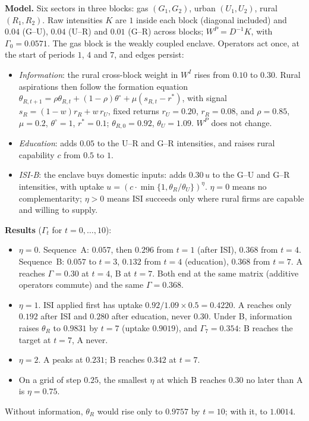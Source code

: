 \documentclass[../solutions_manual.tex]{subfiles}
\begin{document}
 \textbf{Model.} Six sectors in three blocks: gas $(G_1, G_2)$, urban $(U_1, U_2)$, rural $(R_1, R_2)$. Raw intensities $K$ are $1$ inside each block (diagonal included) and $0.04$ (G--U), $0.04$ (U--R) and $0.01$ (G--R) across blocks; $W^P = D^{-1}K$, with $\Gamma_0 = 0.0571$. The gas block is the weakly coupled enclave. Operators act once, at the start of periods $1$, $4$ and $7$, and edges persist:
\begin{itemize}
\item \emph{Information}: the rural cross-block weight in $W^I$ rises from $0.10$ to $0.30$. Rural aspirations then follow the formation equation $\theta_{R,t+1} = \rho\theta_{R,t} + (1-\rho)\theta^\circ + \mu(s_{R,t} - r^*)$, with signal $s_R = (1 - w)r_R + w\,r_U$, fixed returns $r_U = 0.20$, $r_R = 0.08$, and $\rho = 0.85$, $\mu = 0.2$, $\theta^\circ = 1$, $r^* = 0.1$; $\theta_{R,0} = 0.92$, $\theta_U = 1.09$. $W^P$ does not change.
\item \emph{Education}: adds $0.05$ to the U--R and G--R intensities, and raises rural capability $c$ from $0.5$ to $1$.
\item \emph{ISI-B}: the enclave buys domestic inputs: adds $0.30\,u$ to the G--U and G--R intensities, with uptake $u = (c \cdot \min\{1, \theta_R/\theta_U\})^\eta$. $\eta = 0$ means no complementarity; $\eta > 0$ means ISI succeeds only where rural firms are capable and willing to supply.
\end{itemize}

 \textbf{Results} ($\Gamma_t$ for $t = 0, \ldots, 10$):
\begin{itemize}
\item $\eta = 0$. Sequence~A: $0.057$, then $0.296$ from $t = 1$ (after ISI), $0.368$ from $t = 4$. Sequence~B: $0.057$ to $t = 3$, $0.132$ from $t = 4$ (education), $0.368$ from $t = 7$. A reaches $\Gamma = 0.30$ at $t = 4$, B at $t = 7$. Both end at the same matrix (additive operators commute) and the same $\Gamma = 0.368$.
\item $\eta = 1$. ISI applied first has uptake $0.92/1.09 \times 0.5 = 0.4220$. A reaches only $0.192$ after ISI and $0.280$ after education, never $0.30$. Under B, information raises $\theta_R$ to $0.9831$ by $t = 7$ (uptake $0.9019$), and $\Gamma_7 = 0.354$: B reaches the target at $t = 7$, A never.
\item $\eta = 2$. A peaks at $0.231$; B reaches $0.342$ at $t = 7$.
\item On a grid of step $0.25$, the smallest $\eta$ at which B reaches $0.30$ no later than A is $\eta = 0.75$.
\end{itemize}
Without information, $\theta_R$ would rise only to $0.9757$ by $t = 10$; with it, to $1.0014$.
\end{document}
